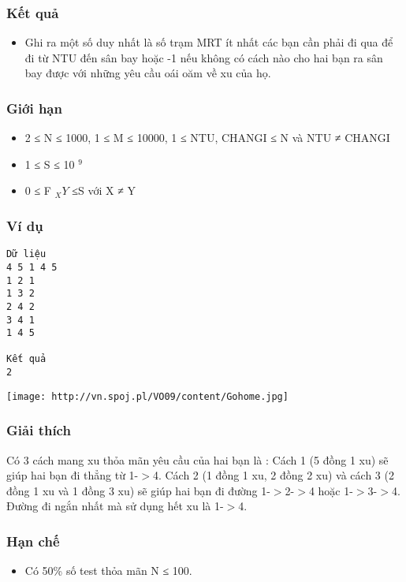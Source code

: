 \subsubsection{   Kết quả  }
\begin{itemize}
	\item     Ghi ra một số duy nhất là         số trạm MRT ít nhất        các bạn cần phải đi qua để đi từ NTU đến sân bay hoặc -1 nếu không có cách nào cho hai bạn ra sân bay được với những yêu cầu oái oăm về xu của họ.   
\end{itemize}

\subsubsection{   Giới hạn  }
\begin{itemize}
	\item     2 ≤ N ≤ 1000, 1 ≤ M ≤ 10000, 1 ≤ NTU, CHANGI ≤ N và NTU ≠ CHANGI   
	\item     1 ≤ S ≤ 10    $^     9    $
	\item     0 ≤ F    $_     XY    $    ≤S với X ≠ Y   
\end{itemize}

\subsubsection{   Ví dụ  }
\begin{verbatim}
Dữ liệu
4 5 1 4 5
1 2 1
1 3 2
2 4 2
3 4 1
1 4 5	

Kết quả
2
\end{verbatim}
\texttt{[image: http://vn.spoj.pl/VO09/content/Gohome.jpg]}

\subsubsection{   Giải thích  }

   Có 3 cách mang xu thỏa mãn yêu cầu của hai bạn là : Cách 1 (5 đồng 1 xu) sẽ giúp hai bạn đi thẳng từ 1-$>$4. Cách 2 (1 đồng 1 xu, 2 đồng 2 xu) và cách 3 (2 đồng 1 xu và 1 đồng 3 xu) sẽ giúp hai bạn đi đường 1-$>$2-$>$4 hoặc 1-$>$3-$>$4. Đường đi ngắn nhất mà sử dụng hết xu là 1-$>$4.  

\subsubsection{   Hạn chế  }
\begin{itemize}
	\item     Có 50\% số test thỏa mãn N ≤ 100.   
\end{itemize}